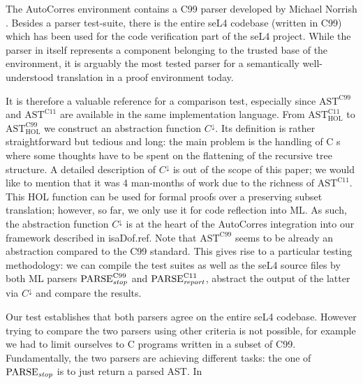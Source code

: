 \begin{isabellebody}
%
\begin{isamarkuptext}%
The AutoCorres environment contains a C99 parser developed by Michael Norrish \cite{DBLP:conf/sosp/KleinEHACDEEKNSTW09}. Besides a parser test-suite, there is the entire seL4
codebase (written in C99) which has been used for the code verification part of the seL4
project. While the parser in itself represents a component belonging to the trusted base of the
environment, it is arguably the most tested parser for a semantically well-understood translation in
a proof environment today.%
\end{isamarkuptext}\isamarkuptrue%
%
\begin{isamarkuptext}%
It is therefore a valuable reference for a comparison test, especially since
$\text{AST}^\text{C99}$ and $\text{AST}^\text{C11}$ are available in the same implementation
language. From $\text{AST}^\text{C11}_{\text{HOL}}$ to $\text{AST}^\text{C99}_{\text{HOL}}$ we
construct an abstraction function $C^\downarrow$. Its definition is rather straightforward but
tedious and long: the main problem is the handling of C s where some thoughts
have to be spent on the flattening of the recursive tree structure. A detailed description of
$C^\downarrow$ is out of the scope of this paper; we would like to mention that it was 4 man-months
of work due to the richness of $\text{AST}^\text{C11}$. This HOL function can be used for formal
proofs over a preserving subset translation; however, so far, we only use it for code reflection
into ML. As such, the abstraction function $C^\downarrow$ is at the heart of the AutoCorres
integration into our framework described in \csname isaDof.ref. Note that
$\text{AST}^{\text{C99}}$ seems to be already an abstraction compared to the C99 standard. This
gives rise to a particular testing methodology: we can compile the test suites as well as the seL4
source files by both ML parsers $\text{PARSE}_{\text{\emph{stop}}}^{\text{C99}}$ and
$\text{PARSE}_{\text{\emph{report}}}^{\text{C11}}$, abstract the output of the latter via
$C^\downarrow$ and compare the results.%
\end{isamarkuptext}\isamarkuptrue%
%
\begin{isamarkuptext}%
Our test establishes that both parsers agree on the entire seL4 codebase. However
trying to compare the two parsers using other criteria is not possible, for example we had to limit
ourselves to C programs written in a subset of C99. Fundamentally, the two parsers are achieving
different tasks: the one of $\text{PARSE}_{\text{\emph{stop}}}$ is to just return a parsed AST. In

\end{isamarkuptext}
\end{isabellebody}
